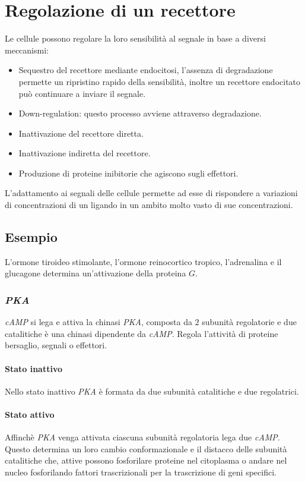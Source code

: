\section{Regolazione di un recettore}
Le cellule possono regolare la loro sensibilit\`a al segnale in base a diversi meccanismi:
\begin{multicols}{2}
	\begin{itemize}
		\item Sequestro del recettore mediante endocitosi, l'assenza di degradazione permette un ripristino rapido della sensibilit\`a, inoltre un recettore endocitato pu\`o continuare a inviare il segnale.
		\item Down-regulation: questo processo avviene attraverso degradazione.
		\item Inattivazione del recettore diretta.
		\item Inattivazione indiretta del recettore.
		\item Produzione di proteine inibitorie che agiscono sugli effettori.
	\end{itemize}
\end{multicols}
L'adattamento ai segnali delle cellule permette ad esse di rispondere a variazioni di concentrazioni di un ligando in un ambito molto vasto di sue concentrazioni.

	\subsection{Esempio}
	L'ormone tiroideo stimolante, l'ormone reinocortico tropico, l'adrenalina e il glucagone determina un'attivazione della proteina $G$.

		\subsubsection{\emph{PKA}}
		\emph{cAMP} si lega e attiva la chinasi \emph{PKA}, composta da $2$ subunit\`a regolatorie e due catalitiche \`e una chinasi dipendente da \emph{cAMP}.
		Regola l'attivit\`a di proteine bersaglio, segnali o effettori.

			\paragraph{Stato inattivo}
			Nello stato inattivo \emph{PKA} \`e formata da due subunit\`a catalitiche e due regolatrici.

			\paragraph{Stato attivo}
			Affinch\`e \emph{PKA} venga attivata ciascuna subunit\`a regolatoria lega due \emph{cAMP}.
			Questo determina un loro cambio conformazionale e il distacco delle subunit\`a catalitiche che, attive possono fosforilare proteine nel citoplasma o andare nel nucleo fosforilando fattori trascrizionali per la trascrizione di geni specifici.

